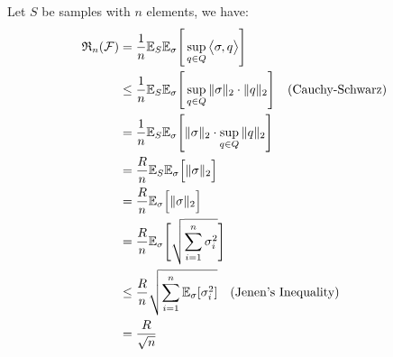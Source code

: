 \begin{proof*}
    Let $S$ be samples with $n$ elements, we have:
    \begin{align*}
        \mathfrak{R}_n(\mathcal{F}) 
            &= \frac{1}{n}\mathbb{E}_S\mathbb{E}_\sigma \Bigg[ 
                \sup_{q\in Q} \big< \sigma, q \big>
             \Bigg] \\
            &\le \frac{1}{n} \mathbb{E}_S\mathbb{E}_\sigma \Bigg[ 
                \sup_{q\in Q} \|\sigma\|_2 \cdot \|q\|_2
             \Bigg] \ \ \ (\text{Cauchy-Schwarz}) \\
            &= \frac{1}{n} \mathbb{E}_S\mathbb{E}_\sigma \Bigg[ 
                \|\sigma\|_2 \cdot \sup_{q\in Q} \|q\|_2
             \Bigg] \\
            &= \frac{R}{n} \mathbb{E}_S\mathbb{E}_\sigma \Big[ \|\sigma\|_2 \Big] \\
            &= \frac{R}{n} \mathbb{E}_\sigma \Big[ \|\sigma\|_2 \Big] \\
            &= \frac{R}{n} \mathbb{E}_\sigma \Bigg[ 
                \sqrt{
                    \sum_{i=1}^n \sigma_i^2
                }
             \Bigg] \\
            &\le \frac{R}{n}\sqrt{
                \sum_{i=1}^n \mathbb{E}_\sigma [\sigma_i^2]
            } \ \ \ (\text{Jenen's Inequality}) \\
            &= \frac{R}{\sqrt n}
    \end{align*}
\end{proof*}


